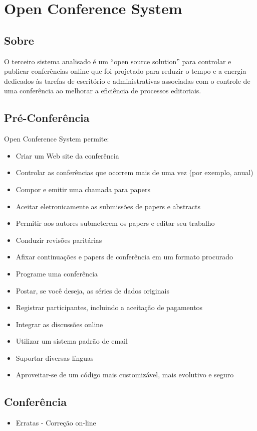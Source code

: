 \documentclass[letter]{article}
\begin{document}
\section{Open Conference System}
\subsection{Sobre}
O terceiro sistema analisado é um “open source solution” para controlar e publicar conferências online que foi projetado para reduzir o tempo e a energia dedicados às tarefas de escritório e administrativas associadas com o controle de uma conferência ao melhorar a eficiência de processos editoriais. 


\subsection{Pré-Conferência}
Open Conference System permite:
\begin{itemize}
\item Criar um Web site da conferência
\item Controlar as conferências que ocorrem mais de uma vez (por exemplo, anual)
\item Compor e emitir uma chamada para papers
\item Aceitar eletronicamente as submissões de papers e abstracts
\item Permitir aos autores submeterem os papers e editar seu trabalho
\item Conduzir revisões paritárias
\item Afixar continuações e papers de conferência em um formato procurado
\item Programe uma conferência
\item Postar, se você deseja, as séries de dados originais
\item Registrar participantes, incluindo a aceitação de pagamentos
\item Integrar as discussões online
\item Utilizar um sistema padrão de email
\item Suportar diversas línguas 
\item Aproveitar-se de um código mais customizável, mais evolutivo e seguro 
\end{itemize}


\subsection{Conferência}
\begin{itemize}
\item Erratas - Correção on-line
\end{itemize}
\end{document}
